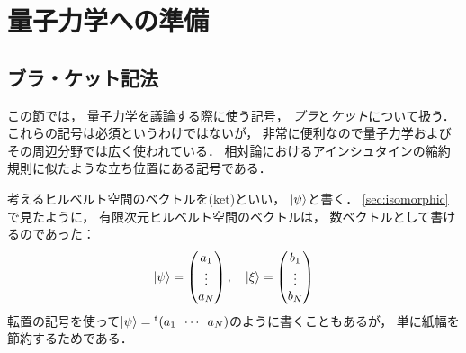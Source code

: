 \documentclass[
]{sotsu}
\begin{document}
\section{量子力学への準備}

\subsection{ブラ・ケット記法}

この節では，
量子力学を議論する際に使う記号，
\emph{ブラ}と\emph{ケット}について扱う．
これらの記号は必須というわけではないが，
非常に便利なので量子力学およびその周辺分野では広く使われている．
相対論におけるアインシュタインの縮約規則に似たような立ち位置にある記号である．

考えるヒルベルト空間のベクトルを(ket)といい，
$\lvert\psi\rangle$と書く．
\cref{sec:isomorphic}で見たように，
有限次元ヒルベルト空間のベクトルは，
数ベクトルとして書けるのであった：
\begin{equation*}
    \lvert\psi\rangle = 
    \begin{pmatrix}
        a_1  \\  \vdots  \\  a_N
    \end{pmatrix}
    ,
    \quad
    \lvert\xi\rangle = 
    \begin{pmatrix}
        b_1  \\  \vdots  \\  b_N
    \end{pmatrix}
\end{equation*}
転置の記号を使って$\ket{\psi} = \cvector{a_1 ; \cdots ; a_N}$のように書くこともあるが，
単に紙幅を節約するためである．
\end{document}

